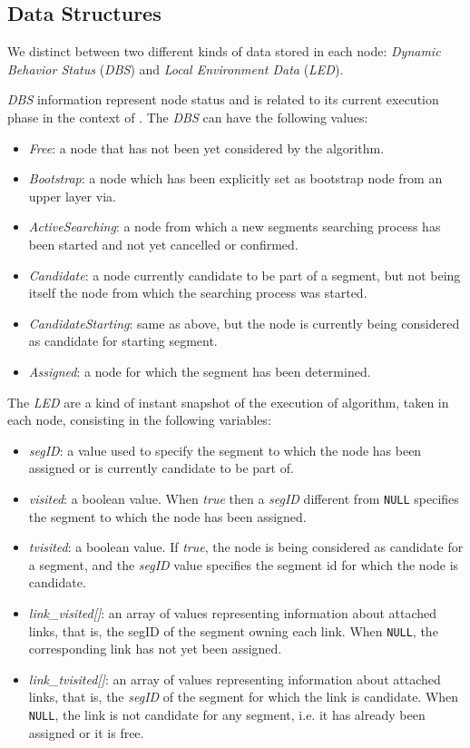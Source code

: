 \subsection{\disr{} Data Structures}
\label{ssec:disr_data}

We distinct between two different kinds of data stored in each node:
\emph{Dynamic Behavior Status} (\emph{DBS}) and \emph{Local
Environment Data} (\emph{LED}).

\emph{DBS} information represent node status and is related to its
current execution phase in the context of \disr{}.
The \emph{DBS} can have the following values:

\begin{itemize}
\item{\emph{Free}}: a node that has  not been yet considered  by the \disr{} algorithm.
\item{\emph{Bootstrap}}: a node which has been explicitly set as bootstrap node from
an upper layer via. 
\item{\emph{ActiveSearching}}: a node from which a new segments searching process has
been started and not yet cancelled or confirmed. 
\item{\emph{Candidate}}: a node currently candidate to be part of a segment, but not being itself the node from which the searching process was started. 
\item{\emph{CandidateStarting}}: same as above, but the node is currently being considered as candidate
for starting segment. 
\item{\emph{Assigned}}: a node for which the segment has been determined.  
\end{itemize}

The \emph{LED} are a kind of instant snapshot of the execution of \disr{} algorithm, taken in each node,
consisting in the following variables:

\begin{itemize}
\item{\emph{segID}}: a value used to specify the segment to which the
node has been assigned or is currently candidate to be part of.
\item{\emph{visited}}: a boolean value. When \emph{true}
then a \emph{segID} different from \texttt{NULL} specifies the segment 
to which the node has been assigned. 
\item{\emph{tvisited}}: a boolean value. If \emph{true}, the node is
being considered as candidate for a segment, and the \emph{segID} value
specifies the segment id for which the node is candidate. 
\item{\emph{link\_visited[]}}: an array
of values representing information about attached links, that is, the
segID of the segment owning each link. When \texttt{NULL}, the corresponding link has not yet been
assigned.
\item{\emph{link\_tvisited[]}}: an array of
values representing information about attached links, that is, the \emph{segID} of
the segment for which the link is candidate. When \texttt{NULL}, the link is
not candidate for any segment, i.e. it has already been assigned or it is free.
\end{itemize}


